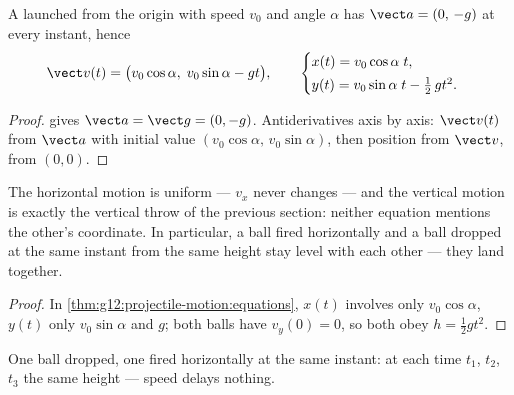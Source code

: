 \begin{theorem}\label{thm:g12:projectile-motion:equations}
A  launched from the origin with speed $v_0$ and angle $\alpha$
has $\vect a = (0,\,-g)$ at every instant, hence
\[
\vect v(t) = \bigl(v_0\cos\alpha,\; v_0\sin\alpha - g t\bigr),
\qquad
\begin{cases}
x(t) = v_0\cos\alpha\; t,\\[2pt]
y(t) = v_0\sin\alpha\; t - \tfrac12\, g t^2 .
\end{cases}
\]
\end{theorem}

\begin{proof}
 gives $\vect a = \vect g = (0,-g)$. Antiderivatives
axis by axis: $\vect v(t)$ from $\vect a$ with initial value
$(v_0\cos\alpha,\, v_0\sin\alpha)$, then position from $\vect v$, from $(0,0)$.
\end{proof}

\begin{proposition}\label{prop:g12:projectile-motion:independence}
The horizontal motion is uniform --- $v_x$ never changes --- and the
vertical motion is exactly the vertical throw of the previous section:
neither equation mentions the other's coordinate. In particular, a ball
fired horizontally and a ball dropped at the same instant from the same
height stay level with each other --- they land together.
\end{proposition}

\begin{proof}
In \cref{thm:g12:projectile-motion:equations}, $x(t)$ involves only
$v_0\cos\alpha$, $y(t)$ only $v_0\sin\alpha$ and $g$; both balls have
$v_y(0) = 0$, so both obey $h = \tfrac12 gt^2$.
\end{proof}

\begin{omfigure}

{\small One ball dropped, one fired horizontally at the same instant: at
each time $t_1$, $t_2$, $t_3$ the same height --- speed delays nothing.}
\end{omfigure}

